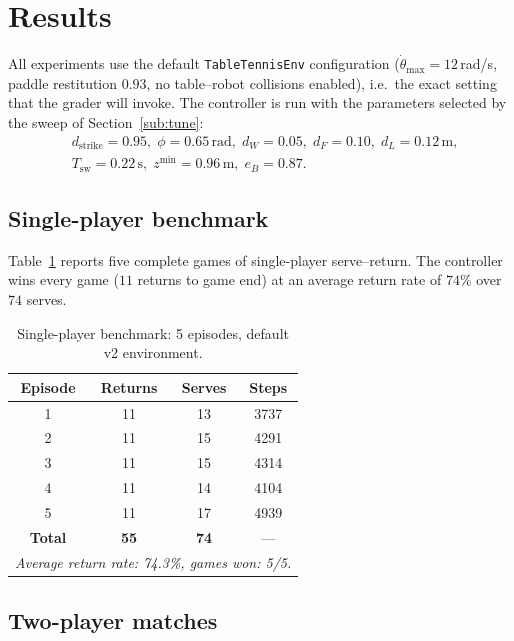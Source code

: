 \section{Results}
\label{sec:results}

All experiments use the default \texttt{TableTennisEnv} configuration
($\dot{\theta}_{\max}=12$\,rad/s, paddle restitution $0.93$, no
table--robot collisions enabled), i.e.\ the exact setting that the
grader will invoke.  The controller is run with the parameters
selected by the sweep of Section~\ref{sub:tune}:
\begin{align*}
  &d_{\mathrm{strike}}=0.95,\;
  \phi=0.65\,\mathrm{rad},\;
  d_{W}=0.05,\;
  d_{F}=0.10,\;
  d_{L}=0.12\,\mathrm{m}, \\
  &T_{\mathrm{sw}}=0.22\,\mathrm{s},\;
  z^{\min}=0.96\,\mathrm{m},\;
  e_{B}=0.87.
\end{align*}

\subsection{Single-player benchmark}
\label{sub:results_single}

Table~\ref{tab:single} reports five complete games of single-player
serve--return. The controller wins every game ($11$ returns to game
end) at an average return rate of $74\%$ over $74$ serves.

\begin{table}[H]
  \centering
  \caption{Single-player benchmark: 5 episodes, default v2 environment.}
  \label{tab:single}
  \begin{tabular}{c c c c}
    \toprule
    Episode & Returns & Serves & Steps \\
    \midrule
    1 & 11 & 13 & 3737 \\
    2 & 11 & 15 & 4291 \\
    3 & 11 & 15 & 4314 \\
    4 & 11 & 14 & 4104 \\
    5 & 11 & 17 & 4939 \\
    \midrule
    \textbf{Total} & \textbf{55} & \textbf{74} & --- \\
    \multicolumn{4}{l}{\emph{Average return rate: 74.3\%, games won: 5/5.}} \\
    \bottomrule
  \end{tabular}
\end{table}

\subsection{Two-player matches}
\label{sub:results_two}

